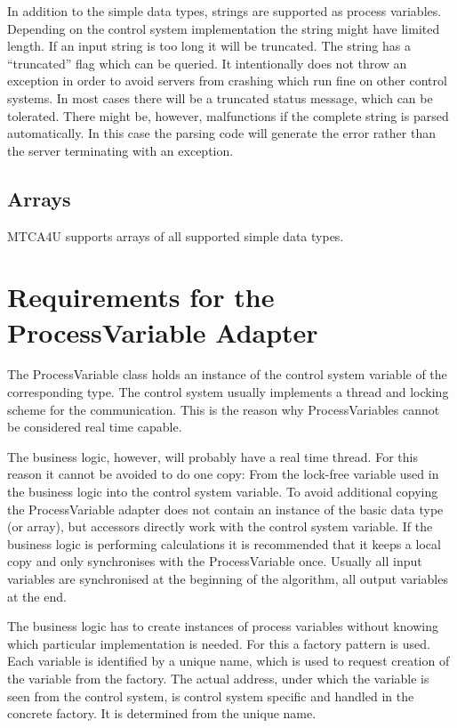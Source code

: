 \documentclass[11pt,a4paper]{scrartcl}
\begin{document}
In addition to the simple data types, strings are supported as process variables.
Depending on the control system implementation the string might have limited
length. If an input string is too long it will be truncated. The string has a
“truncated” flag which can be queried. It intentionally does not throw an
exception in order to avoid servers from crashing which run fine on other
control systems. In most cases there will be a truncated status message, which
can be tolerated. There might be, however, malfunctions if the complete string
is parsed automatically. In this case the parsing code will generate the error
rather than the server terminating with an exception. 

\subsection{Arrays}

MTCA4U supports arrays of all supported simple data types.

\section{Requirements for the ProcessVariable Adapter}\label{section_process_variable_adapter}

The ProcessVariable class holds an instance of the control system variable of
the corresponding type. The control system usually implements a thread and
locking scheme for the communication. This is the reason why ProcessVariables
cannot be considered real time capable. 

The business logic, however, will probably have a real time thread. For this
reason it cannot be avoided to do one copy: From the lock-free variable used
in the business logic into the control system variable. To avoid additional
copying the ProcessVariable adapter does not contain an instance of the basic
data type (or array), but accessors directly work with the control system
variable. 
If the business logic is performing calculations it is recommended that 
it keeps a local copy and only synchronises with the ProcessVariable once.
Usually all input variables are synchronised at the beginning of the 
algorithm, all output variables at the end.

The business logic has to create instances of process variables without
knowing which particular implementation is needed. For this a factory pattern
is used. Each variable is identified by a unique name, which is used to
request creation of the variable from the factory. The actual address, under
which the variable is seen from the control system, is control system specific
and handled in the concrete factory. It is determined from the unique name. 
\end{document}
